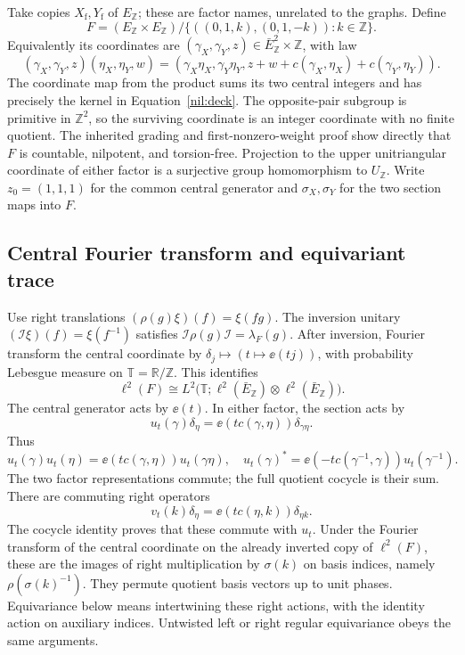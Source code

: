 Take copies \(X_{\mathrm f},Y_{\mathrm f}\) of \(E_{\mathbb Z}\);
these are factor names, unrelated to the graphs. Define
\begin{equation}\label{nil:deck}
 F=(E_{\mathbb Z}\times E_{\mathbb Z})/
       \{((0,1,k),(0,1,-k)):k\in\mathbb Z\}.
\end{equation}
Equivalently its coordinates are
\((\gamma_X,\gamma_Y,z)\in\bar E_{\mathbb Z}^2\times\mathbb Z\),
with law
\[
 (\gamma_X,\gamma_Y,z)(\eta_X,\eta_Y,w)
 =(\gamma_X\eta_X,\gamma_Y\eta_Y,
       z+w+c(\gamma_X,\eta_X)+c(\gamma_Y,\eta_Y)).
\]
The coordinate map from the product sums its two central integers
and has precisely the kernel in Equation~\ref{nil:deck}.
The opposite-pair subgroup is primitive in \(\mathbb Z^2\), so
the surviving coordinate is an integer coordinate with no finite
quotient. The inherited grading and first-nonzero-weight proof
show directly that \(F\) is countable, nilpotent, and torsion-free.
Projection to the upper unitriangular coordinate of either factor
is a surjective group homomorphism to \(U_{\mathbb Z}\).
Write \(z_0=(1,1,1)\) for the common central generator and
\(\sigma_X,\sigma_Y\) for the two section maps into \(F\).

\subsection{Central Fourier transform and equivariant trace}

Use right translations \((\rho(g)\xi)(f)=\xi(fg)\).
The inversion unitary \((\mathcal I\xi)(f)=\xi(f^{-1})\) satisfies
\(\mathcal I\rho(g)\mathcal I=\lambda_F(g)\).
After inversion, Fourier transform the central coordinate by
\(\delta_j\mapsto(t\mapsto\ee(tj))\), with probability Lebesgue
measure on \(\mathbb T=\mathbb R/\mathbb Z\). This identifies
\begin{equation}\label{nil:fourier}
 \ell^2(F)\cong L^2\bigl(\mathbb T;
               \ell^2(\bar E_{\mathbb Z})\otimes
               \ell^2(\bar E_{\mathbb Z})\bigr).
\end{equation}
The central generator acts by \(\ee(t)\). In either factor, the
section acts by
\begin{equation}\label{nil:twisted-left}
 u_t(\gamma)\delta_\eta
       =\ee(t c(\gamma,\eta))\delta_{\gamma\eta}.
\end{equation}
Thus
\[
 u_t(\gamma)u_t(\eta)=\ee(t c(\gamma,\eta))u_t(\gamma\eta),
 \quad
 u_t(\gamma)^*=\ee(-t c(\gamma^{-1},\gamma))u_t(\gamma^{-1}).
\]
The two factor representations commute; the full quotient
cocycle is their sum. There are commuting right operators
\begin{equation}\label{nil:twisted-right}
 v_t(k)\delta_\eta=\ee(t c(\eta,k))\delta_{\eta k}.
\end{equation}
The cocycle identity proves that these commute with \(u_t\).
Under the Fourier transform of the central coordinate on the already
inverted copy of \(\ell^2(F)\), these are the images of right multiplication
by \(\sigma(k)\) on basis indices, namely \(\rho(\sigma(k)^{-1})\).
They permute quotient basis vectors up to unit phases.
Equivariance below means intertwining these right actions,
with the identity action on auxiliary indices. Untwisted left
or right regular equivariance obeys the same arguments.

